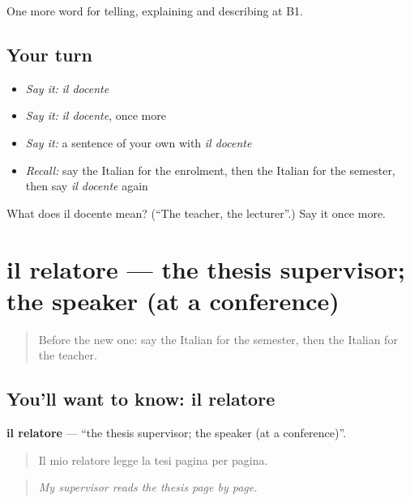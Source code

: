 \begin{grammarlens}[title={What you've built}]
One more word for telling, explaining and describing at B1.
\end{grammarlens}

\subsection*{Your turn}
\begin{itemize}
\raggedright
  \item \emph{Say it:} \emph{il docente}
  \item \emph{Say it:} \emph{il docente}, once more
  \item \emph{Say it:} a sentence of your own with \emph{il docente}
  \item \emph{Recall:} say the Italian for the enrolment, then the Italian for the semester, then say \emph{il docente} again
\end{itemize}

\begin{tcolorbox}[breakable,colback=teal!4,colframe=teal!35!black,title={Before you move on}]
What does il docente mean? (\textquotedblleft{}The teacher, the lecturer\textquotedblright{}.) Say it once more.
\end{tcolorbox}
\section[il relatore]{il relatore — the thesis supervisor; the speaker (at a conference)}

\label{lesson:IT-C381-relatore}



\begin{quote}
Before the new one: say the Italian for the semester, then the Italian for the teacher.
\end{quote}

\subsection*{You'll want to know: il relatore}
\textbf{il relatore} — \textquotedblleft{}the thesis supervisor; the speaker (at a conference)\textquotedblright{}.

\begin{quote}
Il mio relatore legge la tesi pagina per pagina.
\end{quote}

\begin{quote}
\emph{My supervisor reads the thesis page by page.}
\end{quote}

